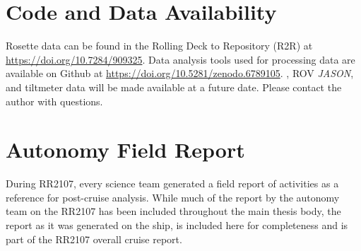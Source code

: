 \section{Code and Data Availability}
Rosette data can be found in the Rolling Deck to Repository (R2R) at \url{https://doi.org/10.7284/909325}. Data analysis tools used for processing \Sentry data are available on Github at \url{https://doi.org/10.5281/zenodo.6789105}. \Sentry, ROV \emph{JASON}, and tiltmeter data will be made available at a future date. Please contact the author with questions.

\newpage
\section{Autonomy Field Report}
During RR2107, every science team generated a field report of activities as a reference for post-cruise analysis. While much of the report by the autonomy team on the RR2107 has been included throughout the main thesis body, the report as it was generated on the ship, is included here for completeness and is part of the RR2107 overall cruise report. 

